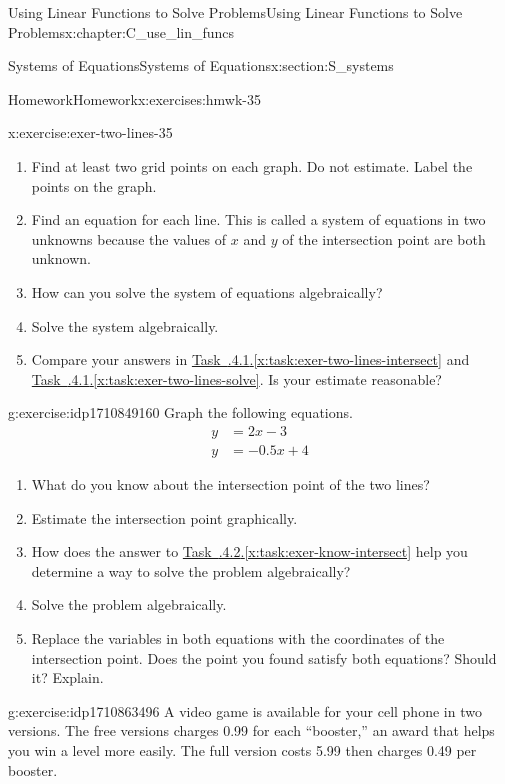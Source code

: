 \documentclass[oneside,10pt,]{book}
\newcommand{\xreffont}{\relax}
\numberwithin{equation}{chapter}
\newcommand{\amp}{&}
\begin{document}
\begin{chapterptx}{Using Linear Functions to Solve Problems}{}{Using Linear Functions to Solve Problems}{}{}{x:chapter:C_use_lin_funcs}
\begin{sectionptx}{Systems of Equations}{}{Systems of Equations}{}{}{x:section:S_systems}
\begin{exercises-subsection}{Homework}{}{Homework}{}{}{x:exercises:hmwk-35}
\begin{divisionexercise}{1}{}{}{x:exercise:exer-two-lines-35}
\begin{enumerate}[font=\bfseries,label=(\alph*),ref=\alph*]
\item{}Find at least two grid points on each graph. Do not estimate. Label the points on the graph.%
\item{}Find an equation for each line. This is called a system of equations in two unknowns because the values of \(x\) and \(y\) of the intersection point are both unknown.%
\item{}How can you solve the system of equations algebraically?%
\item\label{x:task:exer-two-lines-solve}Solve the system algebraically.%
\item{}Compare your answers in \hyperref[x:task:exer-two-lines-intersect]{Task~{\xreffont 3.5.4.1}.{\xreffont\ref{x:task:exer-two-lines-intersect}}} and \hyperref[x:task:exer-two-lines-solve]{Task~{\xreffont 3.5.4.1}.{\xreffont\ref{x:task:exer-two-lines-solve}}}. Is your estimate reasonable?%
\end{enumerate}
\end{divisionexercise}%
\begin{divisionexercise}{2}{}{}{g:exercise:idp1710849160}%
Graph the following equations.%
\begin{align*}
y \amp = 2x - 3\\
y \amp = -0.5x + 4
\end{align*}
%
\begin{enumerate}[font=\bfseries,label=(\alph*),ref=\alph*]
\item\label{x:task:exer-know-intersect}What do you know about the intersection point of the two lines?%
\item{}Estimate the intersection point graphically.%
\item{}How does the answer to \hyperref[x:task:exer-know-intersect]{Task~{\xreffont 3.5.4.2}.{\xreffont\ref{x:task:exer-know-intersect}}} help you determine a way to solve the problem algebraically?%
\item{}Solve the problem algebraically.%
\item{}Replace the variables in both equations with the coordinates of the intersection point. Does the point you found satisfy both equations? Should it? Explain.%
\end{enumerate}
\end{divisionexercise}%
\begin{divisionexercise}{3}{}{}{g:exercise:idp1710863496}%
A video game is available for your cell phone in two versions. The free versions charges \textdollar{}0.99 for each ``booster,'' an award that helps you win a level more easily. The full version costs \textdollar{}5.99 then charges \textdollar{}0.49 per booster.%

\end{divisionexercise}
\end{exercises-subsection}
\end{sectionptx}
\end{chapterptx}
\end{document}
